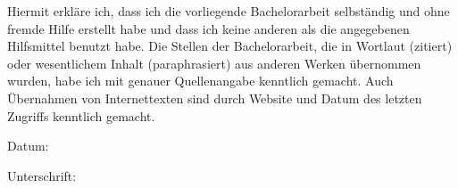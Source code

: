 \label{ch:erklaerung}

Hiermit erkläre ich, dass ich die vorliegende Bachelorarbeit selbständig und ohne fremde Hilfe
erstellt habe und dass ich keine anderen als die angegebenen Hilfsmittel benutzt habe. Die
Stellen der Bachelorarbeit, die in Wortlaut (zitiert) oder wesentlichem Inhalt (paraphrasiert)
aus anderen Werken übernommen wurden, habe ich mit genauer Quellenangabe kenntlich
gemacht. Auch Übernahmen von Internettexten sind durch Website und Datum des letzten
Zugriffs kenntlich gemacht.

Datum:

Unterschrift: